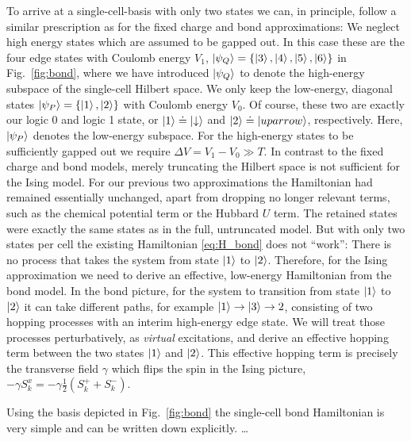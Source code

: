 To arrive at a single-cell-basis with only two states we can, in principle,
follow a similar prescription as for the fixed charge and bond approximations:
We neglect high energy states which are assumed to be gapped out. In this case
these are the four edge states with Coulomb energy $V_1$, $\left|\psi_Q\right> =
\left\{ \left|3\right>, \left|4\right>, \left|5\right>, \left|6\right> \right\}$ in Fig.~\ref{fig:bond},
where we have introduced $\left|\psi_Q\right>$ to denote the high-energy subspace of
the single-cell Hilbert space. We only keep the low-energy, diagonal states
$\left|\psi_P\right> = \left\{ \left|1\right>, \left|2\right> \right\}$ with Coulomb energy $V_0$. Of
course, these two are exactly our logic 0 and logic 1 state, or $\left|1\right> \doteq
\left|\downarrow\right>$ and $\left|2\right> \doteq \left|uparrow\right>$, respectively.  Here,
$\left|\psi_P\right>$ denotes the low-energy subspace. For the high-energy states to be
sufficiently gapped out we require $\Delta V = V_1 - V_0 \gg T$. In contrast to
the fixed charge and bond models, merely truncating the Hilbert space is not
sufficient for the Ising model. For our previous two approximations the
Hamiltonian had remained essentially unchanged, apart from dropping no longer
relevant terms, such as the chemical potential term or the Hubbard $U$ term. The
retained states were exactly the same states as in the full, untruncated model.
But with only two states per cell the existing Hamiltonian \eqref{eq:H_bond}
does not ``work'': There is no process that takes the system from state
$\left|1\right>$ to $\left|2\right>$. Therefore, for the Ising approximation we need to derive
an effective, low-energy Hamiltonian from the bond model. In the bond picture,
for the system to transition from state $\left|1\right>$ to $\left|2\right>$ it can take
different paths, for example $\left|1\right> \rightarrow \left|3\right> \rightarrow{2}$,
consisting of two hopping processes with an interim high-energy edge state. We
will treat those processes perturbatively, as \emph{virtual} excitations, and
derive an effective hopping term between the two states $\left|1\right>$ and $\left|2\right>$.
This effective hopping term is precisely the transverse field $\gamma$ which
flips the spin in the Ising picture, $-\gamma S^x_k = -\gamma \frac{1}{2} \left(
S^+_k + S^-_k \right)$.

Using the basis depicted in Fig.~\ref{fig:bond} the single-cell bond Hamiltonian
is very simple and can be written down explicitly. \ldots









